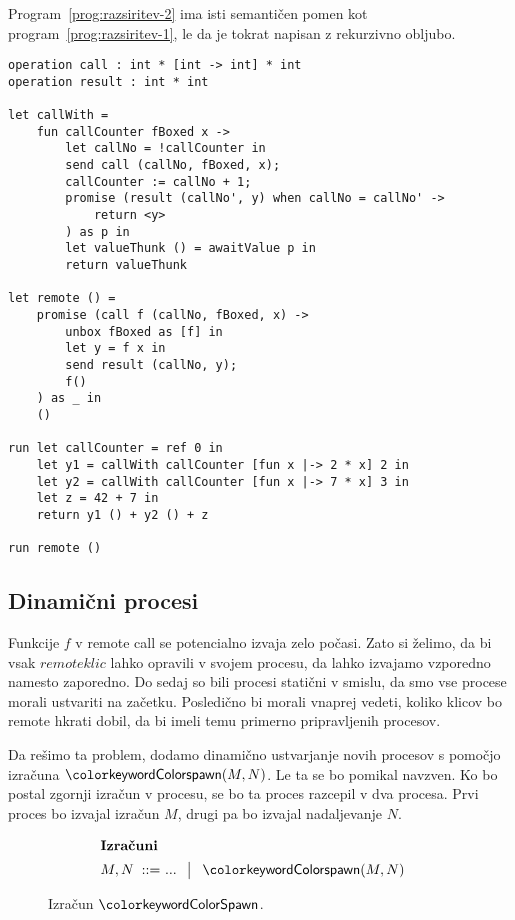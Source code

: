 Program~\ref{prog:razsiritev-2} ima isti semantičen pomen kot program~\ref{prog:razsiritev-1}, le da je tokrat napisan z rekurzivno obljubo.

\begin{lstlisting}[caption={Primer z rekurzivnim prestreznikom},label={prog:razsiritev-2},float,floatplacement=h]
operation call : int * [int -> int] * int
operation result : int * int

let callWith =
	fun callCounter fBoxed x ->
		let callNo = !callCounter in
		send call (callNo, fBoxed, x);
		callCounter := callNo + 1;
		promise (result (callNo', y) when callNo = callNo' ->
			return <y>
		) as p in
		let valueThunk () = awaitValue p in
		return valueThunk

let remote () =
	promise (call f (callNo, fBoxed, x) ->
		unbox fBoxed as [f] in
		let y = f x in
		send result (callNo, y);
		f()
	) as _ in
	()

run	let callCounter = ref 0 in
	let y1 = callWith callCounter [fun x |-> 2 * x] 2 in
	let y2 = callWith callCounter [fun x |-> 7 * x] 3 in
	let z = 42 + 7 in
	return y1 () + y2 () + z

run remote ()
\end{lstlisting}


\subsection{Dinamični procesi}

Funkcije $f$ v remote call se potencialno izvaja zelo počasi. Zato si želimo, da bi vsak $remote klic$ lahko opravili v svojem procesu, da lahko izvajamo vzporedno namesto zaporedno. 
Do sedaj so bili procesi statični v smislu, da smo vse procese morali ustvariti na začetku.
Posledično bi morali vnaprej vedeti, koliko klicov bo remote hkrati dobil, da bi imeli temu primerno pripravljenih procesov.

Da rešimo ta problem, dodamo dinamično ustvarjanje novih procesov s pomočjo izračuna $\tmspawn{M}{N}$. 
Le ta se bo pomikal navzven. Ko bo postal zgornji izračun v procesu, se bo ta proces razcepil v dva procesa. 
Prvi proces bo izvajal izračun $M$, drugi pa bo izvajal nadaljevanje $N$.


\begin{figure}[h]	
	\centering
	\small
	\begin{align*}
	\shortintertext{\textbf{Izračuni}}
	M, N
	\bnfis & ... \,\bnfor\! \tmspawn{M}{N}
	\end{align*}
	
	\caption{Izračun $\tmkw{Spawn}$.}
	\label{fig:izračun-spawn}
\end{figure}

